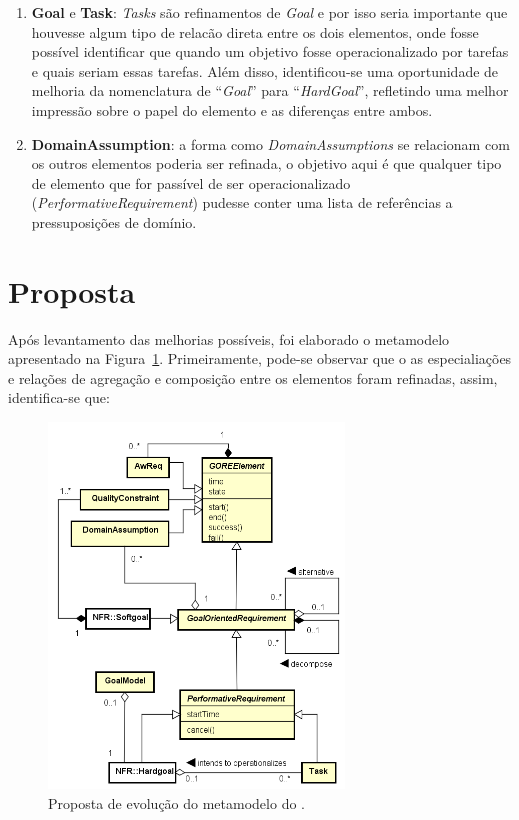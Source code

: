\begin{enumerate}
	\item \textbf{Goal} e \textbf{Task}: \textit{Tasks} são refinamentos de \textit{Goal} e por isso seria importante que houvesse algum tipo de relacão direta entre os dois elementos, onde fosse possível identificar que quando um objetivo fosse operacionalizado por tarefas e quais seriam essas tarefas. Além disso, identificou-se uma oportunidade de melhoria da nomenclatura de ``\textit{Goal}'' para ``\textit{HardGoal}'', refletindo uma melhor impressão sobre o papel do elemento e as diferenças entre ambos. \label{p5}
	
	\item \textbf{DomainAssumption}: a forma como \textit{DomainAssumptions} se relacionam com os outros elementos poderia ser refinada, o objetivo aqui é que qualquer tipo de elemento que for passível de ser operacionalizado (\textit{PerformativeRequirement}) pudesse conter uma lista de referências a pressuposições de domínio. \label{p6}
\end{enumerate}

\section{Proposta}
\label{sec-zanshin-proposta}

Após levantamento das melhorias possíveis, foi elaborado o metamodelo apresentado na Figura~\ref{figura-metamodelo-novo}. Primeiramente, pode-se observar que o as especialiações e relações de agregação e composição entre os elementos foram refinadas, assim, identifica-se que:

\begin{figure}
	\centering
	\includegraphics[width=0.7\textwidth]{figuras/metamodelos/metamodelo-zanshin-novo.png}
	\caption{Proposta de evolução do metamodelo do \framework \zanshin.}
	\label{figura-metamodelo-novo}
\end{figure}

